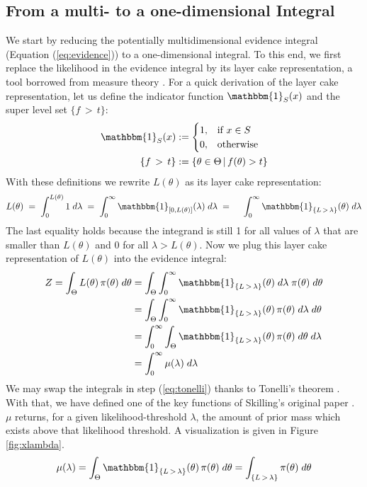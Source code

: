 \documentclass[12pt, a4paper]{report}
\begin{document}
\subsection{From a multi- to a one-dimensional Integral}
We start by reducing the potentially multidimensional evidence integral (Equation (\ref{eq:evidence})) to a one-dimensional integral.
To this end, we first replace the likelihood in the evidence integral by its layer cake representation, a tool borrowed from measure theory \cite[26]{liebloss}.
For a quick derivation of the layer cake representation, let us define the indicator function $\mathbbm{1}_S(x)$  and the super level set $\{f \, > \, t\}$:
\begin{align*}
    \mathbbm{1}_S(x) &:= \begin{cases}
        1, & \textrm{if } x \in S \\
        0, & \textrm{otherwise}
    \end{cases} \\
    \{f \, > \, t\} &:= \{ \theta \in \Theta \, | \, f(\theta) > t \}
\end{align*}
With these definitions we rewrite $L(\theta)$ as its layer cake representation:
\begin{align*}
    L(\theta) 
    \; = \; \int_0^{L(\theta)} 1 \; d\lambda
    \; = \; \int_0^{\infty} \mathbbm{1}_{[0,L(\theta)]}(\lambda) \; d\lambda
    \; = \; \quad \int_0^{\infty} \mathbbm{1}_{\{ L \, > \, \lambda \}}(\theta) \; d\lambda 
\end{align*}
The last equality holds because the integrand is still 1 for all values of $\lambda$ that are smaller than $L(\theta)$ and 0 for all $\lambda > L(\theta)$.
Now we plug this layer cake representation of $L(\theta)$ into the evidence integral:
\begin{align}
    Z = \int_\Theta L(\theta) \, \pi(\theta) \; d\theta &= \int_{\Theta} \int_0^{\infty} \mathbbm{1}_{\{ L \, > \, \lambda \}}(\theta) \; d\lambda \; \pi(\theta) \; d\theta \nonumber\\
    &= \int_\Theta \int_0^{\infty} \mathbbm{1}_{\{ L \, > \, \lambda \}}(\theta) \, \pi(\theta) \; d\lambda \; d\theta \nonumber\\
    &= \int_0^{\infty} \int_\Theta \mathbbm{1}_{\{ L \, > \, \lambda \}}(\theta) \, \pi(\theta) \; d\theta \; d\lambda \label{eq:tonelli}\\
    &= \int_0^{\infty} \mu(\lambda) \; d\lambda
    \label{eq:integral_2}
\end{align}
We may swap the integrals in step (\ref{eq:tonelli}) thanks to Tonelli's theorem \cite[147]{measure_theory}.
With that, we have defined one of the key functions of Skilling's original paper \cite{skilling}. $\mu$ returns, for a given likelihood-threshold $\lambda$, the amount of prior mass which exists above that likelihood threshold. A visualization is given in Figure \ref{fig:xlambda}.
$$
\mu(\lambda) 
= \int_\Theta \mathbbm{1}_{\{ L \, > \, \lambda \}}(\theta) \, \pi(\theta) \; d\theta 
= \int_{\{L \,>\, \lambda\}} \pi(\theta) \; d\theta
$$
\end{document}
